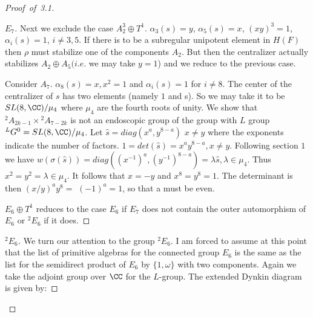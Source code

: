 \documentclass{memo-l}
\theoremstyle{definition}
\theoremstyle{remark}
\numberwithin{section}{chapter}
\numberwithin{equation}{chapter}
\begin{document}
\begin{proof}[Proof\ of\ 3.1]
\begin{proof}[$E_{7}$]
   Next we exclude the case $A_{2}^{3}\oplus T^{1}$.  ${\alpha}_{3}(s) = y$,
${\alpha}_{5}(s) = x$, $(xy)^{3} = 1$, ${\alpha}_{i}(s) = 1$, $i \ne 3,5$.
If there is
to be a subregular unipotent element in $H(F)$ then ${\rho }$ must
stabilize one of the components $A_{2}$.  But then the centralizer actually
stabilizes $A_{2}\oplus A_{5} (i.e$.  we may take $y = 1$) and we reduce to the
previous case.

   Consider $A_{7}$.  ${\alpha}_{8}(s) = x, x^{2} = 1$ and ${\alpha}_{i}(s) = 1$
for $i \ne 8$.  The center of the centralizer of $s$ has two elements
(namely $1$ and s).  So we may take it to be $SL(8,{\CC})/{\mu}_{4}$
where ${\mu}_{4}$ are the fourth roots of unity.  We show that
${}^{2}A_{2k-1}\times {}^{2}A_{7-2k}$ is not an endoscopic group of the group with
$L$ group ${}^{L}G^{0}  =  SL(8,{\CC})/{\mu}_{4}$.  Let $\hat s  =
diag(x^{a},y^{8-a})$ $x \ne y$ where the exponents indicate the number of
factors.  $1  =  det(\hat s )  =  x^{a}y^{8-a}, x \ne y$.  Following section $1$
we have $w({\sigma}(\hat s ))  =  diag((x^{-1})^{a},(y^{-1})^{8-a})  =
{\lambda}\hat s , {\lambda}  \in  {\mu}_{4}$.  Thus $x^{2} = y^{2} = {\lambda}
 \in  {\mu}_{4}$.  It follows that $x = -y$ and $x^{8} = y^{8} = 1$.  The
determinant is then $(x/y)^{a}y^{8}  = $ $(-1)^{a}  =  1$, so that a must be
even.

   $E_{6}\oplus T^{1}$ reduces to the case $E_{6}$ if $E_{7}$ does not contain
the outer automorphism of $E_{6}$ or ${}^{2}E_{6}$ if it does.
\phantom\qedhere
\end{proof}


\begin{proof}[${}^{2}E_{6}$]  We turn our attention to the group ${}^{2}E_{6}$.  I am
forced to assume at this point that the list of primitive algebras for the
connected group $E_{6}$ is the same as the list for the semidirect
product of
$E_{6}$ by $\{1,{\omega}\}$
with two components.  Again we take the adjoint group over ${\CC}$ for the $L$-group.
The extended Dynkin diagram is given by:


\medskip


\end{proof}
\end{proof}
\end{document}
